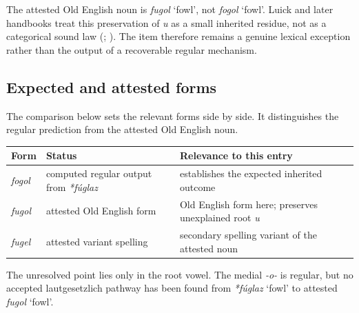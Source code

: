 \documentclass[
  british,
  a4paper,
  openany]{book}
\newcounter{none} %
\providecommand{\Recon}[1]{\emph{*#1}}
{\catcode`→=\active \global\def→{\ensuremath{\rightarrow}}}
\providecommand{\Recon}[1]{\emph{*#1}}
{\catcode`→=\active \global\def→{\ensuremath{\rightarrow}}}
\begin{document}
The attested Old English noun is \emph{fugol} `fowl', not \emph{fogol}
`fowl'. Luick and later handbooks treat this preservation of \emph{u} as
a small inherited residue, not as a categorical sound law
(;
). The item
therefore remains a genuine lexical exception rather than the output of
a recoverable regular mechanism.

\subsection{Expected and attested
forms}\label{expected-and-attested-forms}

The comparison below sets the relevant forms side by side. It
distinguishes the regular prediction from the attested Old English noun.

{\def\LTcaptype{none} %
\begin{longtable}[]{@{}
  >{\raggedright\arraybackslash}p{}
  >{\raggedright\arraybackslash}p{}
  >{\raggedright\arraybackslash}p{}@{}}
\toprule\noalign{}
\begin{minipage}[b]{\linewidth}\raggedright
Form
\end{minipage} & \begin{minipage}[b]{\linewidth}\raggedright
Status
\end{minipage} & \begin{minipage}[b]{\linewidth}\raggedright
Relevance to this entry
\end{minipage} \\
\midrule\noalign{}
\endhead
\bottomrule\noalign{}
\endlastfoot
\emph{fogol} & computed regular output from \emph{*fúglaz} & establishes
the expected inherited outcome \\
\emph{fugol} & attested Old English form & Old English form here;
preserves unexplained root \emph{u} \\
\emph{fugel} & attested variant spelling & secondary spelling variant of
the attested noun \\
\end{longtable}
}

The unresolved point lies only in the root vowel. The medial \emph{-o-}
is regular, but no accepted lautgesetzlich pathway has been found from
\Recon{fúglaz} `fowl' to attested \emph{fugol} `fowl'.
\end{document}
